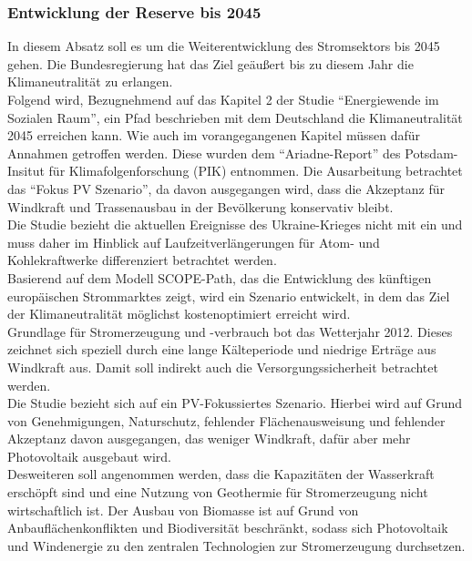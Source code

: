 		\subsubsection{Entwicklung der Reserve bis 2045}
		In diesem Absatz soll es um die Weiterentwicklung des Stromsektors bis 2045 gehen. Die Bundesregierung hat das Ziel geäußert bis zu diesem Jahr die Klimaneutralität zu erlangen.\\
		Folgend wird, Bezugnehmend auf das Kapitel 2 der Studie "`Energiewende im Sozialen Raum"', ein Pfad beschrieben mit dem Deutschland die Klimaneutralität 2045 erreichen kann. Wie auch im vorangegangenen Kapitel müssen dafür Annahmen getroffen werden. Diese wurden dem "`Ariadne-Report"' des Potsdam-Insitut für Klimafolgenforschung (PIK) entnommen.\cite[S.150]{AriadneReport} Die Ausarbeitung betrachtet das "`Fokus PV Szenario"', da davon ausgegangen wird, dass die Akzeptanz für Windkraft und Trassenausbau in der Bevölkerung konservativ bleibt.\\
		Die Studie bezieht die aktuellen Ereignisse des Ukraine-Krieges nicht mit ein und muss daher im Hinblick auf Laufzeitverlängerungen für Atom- und Kohlekraftwerke differenziert betrachtet werden.\\
		
		Basierend auf dem Modell SCOPE-Path, das die Entwicklung des künftigen europäischen Strommarktes zeigt, wird ein Szenario entwickelt, in dem das Ziel der Klimaneutralität möglichst kostenoptimiert erreicht wird.\\
		Grundlage für Stromerzeugung und -verbrauch bot das Wetterjahr 2012. Dieses zeichnet sich speziell durch eine lange Kälteperiode und niedrige Erträge aus Windkraft aus. Damit soll indirekt auch die Versorgungssicherheit betrachtet werden.\cite[S.2]{ESRa_Fraunhofer}\\
		
		Die Studie bezieht sich auf ein PV-Fokussiertes Szenario. Hierbei wird auf Grund von Genehmigungen, Naturschutz, fehlender Flächenausweisung und fehlender Akzeptanz davon ausgegangen, das weniger Windkraft, dafür aber mehr Photovoltaik ausgebaut wird.\cite[S.4]{ESRa_Fraunhofer}\\
		Desweiteren soll angenommen werden, dass die Kapazitäten der Wasserkraft erschöpft sind und eine Nutzung von Geothermie für Stromerzeugung nicht wirtschaftlich ist. Der Ausbau von Biomasse ist auf Grund von Anbauflächenkonflikten und Biodiversität beschränkt, sodass sich Photovoltaik und Windenergie zu den zentralen Technologien zur Stromerzeugung durchsetzen.\cite[S.6]{ESRa_Fraunhofer}\\
		
